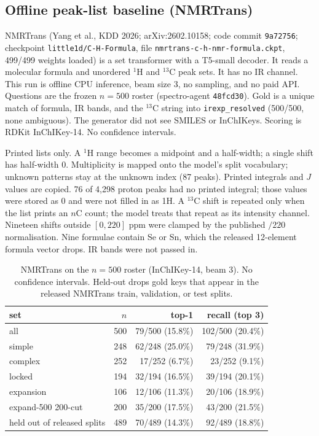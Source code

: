 \subsection{Offline peak-list baseline (NMRTrans)}
\label{si:nmrtrans}

NMRTrans (Yang et al., KDD 2026; arXiv:2602.10158;
code commit \texttt{9a72756}; checkpoint
\texttt{little1d/C-H-Formula}, file
\texttt{nmrtrans-c-h-nmr-formula.ckpt}, 499/499 weights loaded)
is a set transformer with a T5-small decoder.
It reads a molecular formula and unordered $^1$H and $^{13}$C peak sets.
It has no IR channel.
This run is offline CPU inference, beam size 3, no sampling, and no paid API.
Questions are the frozen $n{=}500$ roster
(spectro-agent \texttt{48fcd30}).
Gold is a unique match of formula, IR bands, and the $^{13}$C string
into \texttt{irexp\_resolved} (500/500, none ambiguous).
The generator did not see SMILES or InChIKeys.
Scoring is RDKit InChIKey-14.
No confidence intervals.

Printed lists only.
A $^1$H range becomes a midpoint and a half-width; a single shift has
half-width 0.
Multiplicity is mapped onto the model's split vocabulary; unknown
patterns stay at the unknown index (87 peaks).
Printed integrals and $J$ values are copied.
76 of 4,298 proton peaks had no printed integral; those values were
stored as 0 and were not filled in as 1H.
A $^{13}$C shift is repeated only when the list prints an $n$C count;
the model treats that repeat as its intensity channel.
Nineteen shifts outside $[0,220]$ ppm were clamped by the published
$/220$ normalisation.
Nine formulae contain Se or Sn, which the released 12-element formula
vector drops.
IR bands were not passed in.

\begin{table}[ht]
\caption{NMRTrans on the $n{=}500$ roster (InChIKey-14, beam 3).
No confidence intervals.
Held-out drops gold keys that appear in the released NMRTrans
train, validation, or test splits.}
\centering
\small
\begin{tabular}{@{}lrrr@{}}
\toprule
set & $n$ & top-1 & recall (top 3) \\
\midrule
all & 500 & 79/500 (15.8\%) & 102/500 (20.4\%) \\
simple & 248 & 62/248 (25.0\%) & 79/248 (31.9\%) \\
complex & 252 & 17/252 (6.7\%) & 23/252 (9.1\%) \\
locked & 194 & 32/194 (16.5\%) & 39/194 (20.1\%) \\
expansion & 106 & 12/106 (11.3\%) & 20/106 (18.9\%) \\
expand-500 200-cut & 200 & 35/200 (17.5\%) & 43/200 (21.5\%) \\
held out of released splits & 489 & 70/489 (14.3\%) & 92/489 (18.8\%) \\
\bottomrule
\end{tabular}
\end{table}

